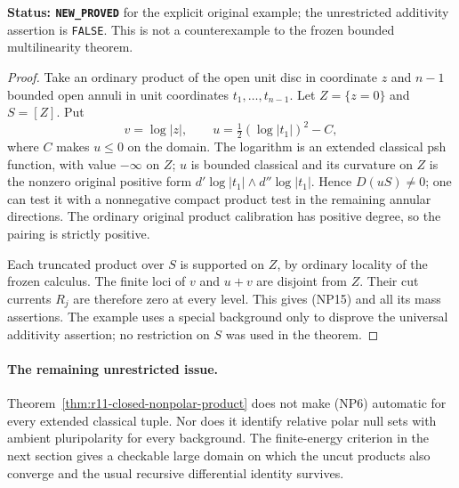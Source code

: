 \noindent\textbf{Status: \texttt{NEW\_PROVED}} for the explicit
original example; the unrestricted additivity assertion is
\texttt{FALSE}.  This is not a counterexample to the frozen bounded
multilinearity theorem.

\begin{proof}
Take an ordinary product of the open unit disc in coordinate $z$
and $n-1$ bounded open annuli in unit coordinates $t_1,\ldots,t_{n-1}$.
Let $Z=\{z=0\}$ and $S=[Z]$.  Put
\[
 v=\log|z|,\qquad
 u=\tfrac12(\log|t_1|)^2-C,
\]
where $C$ makes $u\leq0$ on the domain.  The logarithm is an extended
classical psh function, with value $-\infty$ on $Z$; $u$ is bounded
classical and its curvature on $Z$ is the nonzero original positive
form $d'\log|t_1|\wedge d''\log|t_1|$.  Hence $D(uS)\ne0$;
one can test it with a nonnegative compact product test in the
remaining annular directions.  The ordinary original product
calibration has positive degree, so the pairing is strictly positive.

Each truncated product over $S$ is supported on $Z$, by ordinary
locality of the frozen calculus.  The finite loci of $v$ and $u+v$
are disjoint from $Z$.  Their cut currents $R_j$ are therefore zero
at every level.  This gives (NP15) and all its mass assertions.
The example uses a special background only to disprove the universal
additivity assertion; no restriction on $S$ was used in the theorem.
\end{proof}

\paragraph{The remaining unrestricted issue.}
Theorem~\ref{thm:r11-closed-nonpolar-product} does not make (NP6)
automatic for every extended classical tuple.  Nor does it identify
relative polar null sets with ambient pluripolarity for every background.
The finite-energy criterion in the next section gives a checkable large
domain on which the uncut products also converge and the usual
recursive differential identity survives.
